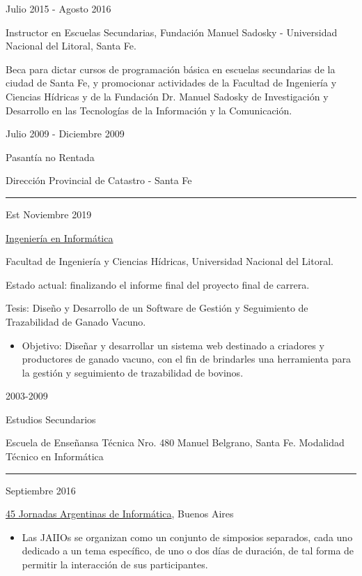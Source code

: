 \documentclass[a4paper,10pt]{article}
\newlength{\cvcolumngapwidth}
\newlength{\cvleftcolumnwidth}
\newlength{\cvrightcolumnwidth}
\newcommand{\cvsectionstyle}[1]{{\normalsize\cvsectionfont\textcolor{cvsectioncolor}{#1}}}
\newcommand{\cvtitlestyle}[1]{{\large\cvtitlefont\textcolor{cvtitlecolor}{#1}}}
\newcommand{\cvdurationstyle}[1]{{\small\cvdurationfont\textcolor{cvdurationcolor}{#1}}}
\newcommand{\cvheadingstyle}[1]{{\normalsize\cvheadingfont\textcolor{cvheadingcolor}{#1}}}
\newlength{\cvafteritemskipamount}
\newlength{\cvaftersectionskipamount}
\newlength{\cvaftertitleskipamount}
\newlength{\cvparskip}
\newcommand{\cvsection}[1]{
    \begin{minipage}[t]{\cvleftcolumnwidth}
        \raggedleft\cvsectionstyle{#1}
    \end{minipage}%
    \hspace{\cvcolumngapwidth}%
    \begin{minipage}[t]{\cvrightcolumnwidth}
        \textcolor{cvrulecolor}{\rule{\cvrightcolumnwidth}{0.3mm}}
    \end{minipage}

    \vspace{\cvaftersectionskipamount}
}
\newcommand{\cvitem}[2]{
    \begin{minipage}[t]{\cvleftcolumnwidth}
        \raggedleft #1
    \end{minipage}%
    \hspace{\cvcolumngapwidth}%
    \begin{minipage}[t]{\cvrightcolumnwidth}
        \setlength{\parskip}{\cvparskip} #2
    \end{minipage}

    \vspace{\cvafteritemskipamount}
}
\newcommand{\cvtitle}[1]{
    \cvtitlestyle{#1}

    \vspace{\cvaftertitleskipamount}
    \vspace{-\cvparskip}
}
\begin{document}
\cvitem{
    \cvdurationstyle{Julio 2015 - Agosto 2016}
}{
    \cvtitle{Instructor en Escuelas Secundarias, Fundación Manuel Sadosky - Universidad Nacional del Litoral, Santa Fe.}
    Beca para dictar cursos de programación básica en escuelas secundarias de la ciudad de Santa Fe, y promocionar actividades de la Facultad de Ingeniería y Ciencias Hídricas y de la Fundación Dr. Manuel Sadosky de Investigación y Desarrollo en las Tecnologías de la Información y la Comunicación.
}

\cvitem{
    \cvdurationstyle{Julio 2009 - Diciembre 2009} 
}{
    \cvtitle{Pasantía no Rentada}
    Dirección Provincial de Catastro - Santa Fe
}


\cvsection{FORMACIÓN ACADÉMICA}

\cvitem{
    \cvdurationstyle{Est Noviembre 2019}
}{
    \cvtitle{\href{http://fich.unl.edu.ar/planificaciones/carrera.php?id=3}{Ingeniería en Informática}}
    
    Facultad de Ingeniería y Ciencias Hídricas, Universidad Nacional del Litoral.
    
    Estado actual: finalizando el informe final del proyecto final de carrera.
    
    Tesis: Diseño y Desarrollo de un Software de Gestión y Seguimiento de Trazabilidad de Ganado Vacuno.
    \begin{itemize}
        \item Objetivo: Diseñar y desarrollar un sistema web destinado a criadores y productores de ganado vacuno, con el fin de brindarles una herramienta para la gestión y seguimiento de trazabilidad de bovinos.
    \end{itemize}
}


\cvitem{
    \cvdurationstyle{2003-2009}
}{
    \cvtitle{Estudios Secundarios}
    Escuela de Enseñansa Técnica Nro. 480 Manuel Belgrano, Santa Fe. Modalidad Técnico en Informática
}

\cvsection{CURSOS Y CERTIFICADOS}

\cvitem{
    \cvdurationstyle{Septiembre 2016}
}{
    \cvheadingstyle{\href{http://45jaiio.sadio.org.ar/}{45 Jornadas Argentinas de Informática}}, Buenos Aires
    \begin{itemize}
        \item Las JAIIOs se organizan como un conjunto de simposios separados, cada uno dedicado a un tema específico, de uno o dos días de duración, de tal forma de permitir la interacción de sus participantes.
    \end{itemize}
}
\end{document}
